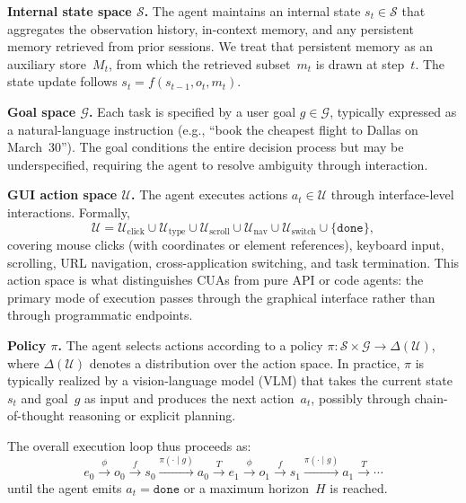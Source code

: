 \noindent\textbf{Internal state space $\mathcal{S}$.}
The agent maintains an internal state $s_t \in \mathcal{S}$ that aggregates the observation history, in-context memory, and any persistent memory retrieved from prior sessions. We treat that persistent memory as an auxiliary store~$M_t$, from which the retrieved subset~$m_t$ is drawn at step~$t$. The state update follows $s_t = f(s_{t-1}, o_t, m_t)$.

\noindent\textbf{Goal space $\mathcal{G}$.}
Each task is specified by a user goal $g \in \mathcal{G}$, typically expressed as a natural-language instruction (e.g., ``book the cheapest flight to Dallas on March~30''). The goal conditions the entire decision process but may be underspecified, requiring the agent to resolve ambiguity through interaction.

\noindent\textbf{GUI action space $\mathcal{U}$.}
The agent executes actions $a_t \in \mathcal{U}$ through interface-level interactions. Formally,
\[
  \mathcal{U} = \mathcal{U}_{\text{click}} \cup \mathcal{U}_{\text{type}} \cup \mathcal{U}_{\text{scroll}} \cup \mathcal{U}_{\text{nav}} \cup \mathcal{U}_{\text{switch}} \cup \{\texttt{done}\},
\]
covering mouse clicks (with coordinates or element references), keyboard input, scrolling, URL navigation, cross-application switching, and task termination. This action space is what distinguishes CUAs from pure API or code agents: the primary mode of execution passes through the graphical interface rather than through programmatic endpoints.

\noindent\textbf{Policy $\pi$.}
The agent selects actions according to a policy $\pi\colon \mathcal{S} \times \mathcal{G} \to \Delta(\mathcal{U})$, where $\Delta(\mathcal{U})$ denotes a distribution over the action space. In practice, $\pi$ is typically realized by a vision-language model (VLM) that takes the current state~$s_t$ and goal~$g$ as input and produces the next action~$a_t$, possibly through chain-of-thought reasoning or explicit planning.


\smallskip
The overall execution loop thus proceeds as:
\[
  e_0 \xrightarrow{\phi} o_0 \xrightarrow{f} s_0 \xrightarrow{\pi(\cdot \mid g)} a_0 \xrightarrow{T} e_1 \xrightarrow{\phi} o_1 \xrightarrow{f} s_1 \xrightarrow{\pi(\cdot \mid g)} a_1 \xrightarrow{T} \cdots
\]
until the agent emits $a_t = \texttt{done}$ or a maximum horizon~$H$ is reached.

